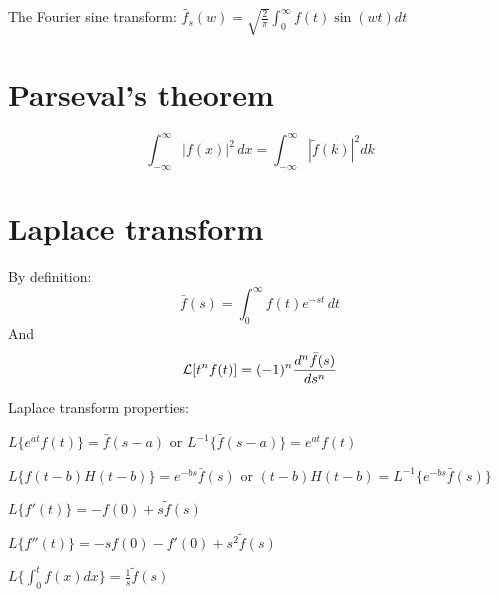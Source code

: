 \documentclass[12pt,twoside]{article}
\begin{document}
The Fourier sine transform: $ \tilde{f_s}(w) = \sqrt{\frac{2}{\pi}} \int_0^\infty f(t) \sin(w t) dt$

\section{Parseval's theorem}

\[
	\int_{-\infty}^{\infty} |f(x)|^2 \, dx = \int_{-\infty}^{\infty} |\tilde{f}(k)|^2 dk 
\]

\section{Laplace transform}
By definition:
\[
	\bar{f}(s) = \int_{0}^{\infty} f(t) e^{-st} \, dt
\]
And
\[
	\ml{L} [t^n f(t)] = (-1)^n \frac{d^n \bar{f}(s)} {ds^n} %
\]

Laplace transform properties:
\bi
	\item $L \{ e^{a t} f(t)  \} = \bar{f} (s-a)$ or $L^{-1} \{ \bar{f} (s-a)\} = e^{a t} f(t) $
	\item  $L \{ f(t-b) H(t-b) \} = e^{-b s} \bar{f} (s)$ or $(t-b) H(t-b) = L^{-1}\{e^{-bs} \bar{f}(s)\}$
	\item $L\{f'(t)\} = -f(0) + s \tilde{f}(s)$
	\item $L\{f''(t)\} = -s f(0) -f'(0) + s^2 \tilde{f}(s)$
	\item $L\{ \int_0^t f(x) dx \} = \frac{1}{s} \tilde{f}(s)$
\ei
\end{document}
